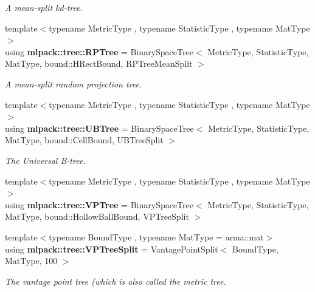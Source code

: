 \begin{DoxyCompactItemize}
\begin{DoxyCompactList}\small\item\em A mean-\/split kd-\/tree. \end{DoxyCompactList}\item 
{\footnotesize template$<$typename Metric\+Type , typename Statistic\+Type , typename Mat\+Type $>$ }\\using {\bf mlpack\+::tree\+::\+R\+P\+Tree} = Binary\+Space\+Tree$<$ Metric\+Type, Statistic\+Type, Mat\+Type, bound\+::\+H\+Rect\+Bound, R\+P\+Tree\+Mean\+Split $>$
\begin{DoxyCompactList}\small\item\em A mean-\/split random projection tree. \end{DoxyCompactList}\item 
{\footnotesize template$<$typename Metric\+Type , typename Statistic\+Type , typename Mat\+Type $>$ }\\using {\bf mlpack\+::tree\+::\+U\+B\+Tree} = Binary\+Space\+Tree$<$ Metric\+Type, Statistic\+Type, Mat\+Type, bound\+::\+Cell\+Bound, U\+B\+Tree\+Split $>$
\begin{DoxyCompactList}\small\item\em The Universal B-\/tree. \end{DoxyCompactList}\item 
{\footnotesize template$<$typename Metric\+Type , typename Statistic\+Type , typename Mat\+Type $>$ }\\using {\bf mlpack\+::tree\+::\+V\+P\+Tree} = Binary\+Space\+Tree$<$ Metric\+Type, Statistic\+Type, Mat\+Type, bound\+::\+Hollow\+Ball\+Bound, V\+P\+Tree\+Split $>$
\item 
{\footnotesize template$<$typename Bound\+Type , typename Mat\+Type  = arma\+::mat$>$ }\\using {\bf mlpack\+::tree\+::\+V\+P\+Tree\+Split} = Vantage\+Point\+Split$<$ Bound\+Type, Mat\+Type, 100 $>$
\begin{DoxyCompactList}\small\item\em The vantage point tree (which is also called the metric tree. \end{DoxyCompactList}\end{DoxyCompactItemize}
